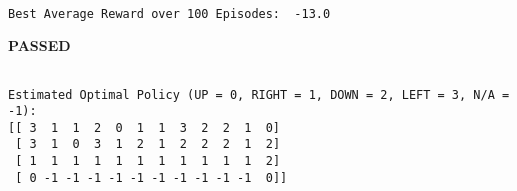 \documentclass[11pt]{article}
\begin{document}
    \begin{center}
    \end{center}
    { \hspace*{\fill} \\}
    
    \begin{Verbatim}[commandchars=\\\{\}]
Best Average Reward over 100 Episodes:  -13.0

    \end{Verbatim}

    \textbf{{PASSED}}

    
    \begin{Verbatim}[commandchars=\\\{\}]

Estimated Optimal Policy (UP = 0, RIGHT = 1, DOWN = 2, LEFT = 3, N/A = -1):
[[ 3  1  1  2  0  1  1  3  2  2  1  0]
 [ 3  1  0  3  1  2  1  2  2  2  1  2]
 [ 1  1  1  1  1  1  1  1  1  1  1  2]
 [ 0 -1 -1 -1 -1 -1 -1 -1 -1 -1 -1  0]]

    \end{Verbatim}
\end{document}

